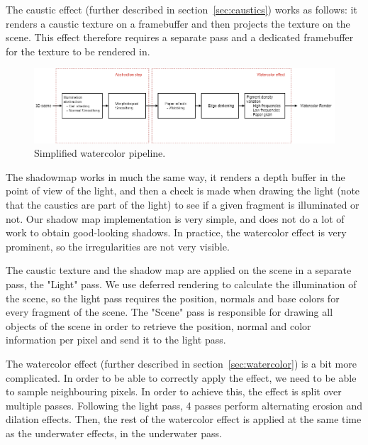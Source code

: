 \documentclass{article}
\begin{document}
\medskip \par
\noindent
The caustic effect (further described in section~\ref{sec:caustics}) works as follows: 
it renders a caustic texture on a framebuffer and then projects the texture on the scene. 
This effect therefore requires a separate pass and a dedicated framebuffer for the texture to be rendered in.

\begin{figure}[h]
    \centering
    \includegraphics[width=.9\linewidth]{imgs/watercolor_pipeline.png}
    \caption{Simplified watercolor pipeline.}
    \label{fig:watercolor_pipeline}
\end{figure}

\bigskip \par
\noindent
The shadowmap works in much the same way, it renders a depth buffer in the point of view of the light, 
and then a check is made when drawing the light (note that the caustics are part of the light) 
to see if a given fragment is illuminated or not. Our shadow map implementation is very simple, 
and does not do a lot of work to obtain good-looking shadows. In practice, the watercolor effect 
is very prominent, so the irregularities are not very visible.

\medskip \par
\noindent
The caustic texture and the shadow map are applied on the scene in a separate pass, the "Light" pass. 
We use deferred rendering to calculate the illumination of the scene, so the light pass requires the position, 
normals and base colors for every fragment of the scene. 
The "Scene" pass is responsible for drawing all objects of the scene in order to retrieve the position, 
normal and color information per pixel and send it to the light pass.

\medskip \par
\noindent
The watercolor effect (further described in section~\ref{sec:watercolor}) is a bit more complicated. 
In order to be able to correctly apply the effect, we need to be able to sample neighbouring pixels. 
In order to achieve this, the effect is split over multiple passes. Following the light pass, 
4 passes perform alternating erosion and dilation effects. 
Then, the rest of the watercolor effect is applied at the same time as the underwater effects, 
in the underwater pass.
\end{document}
